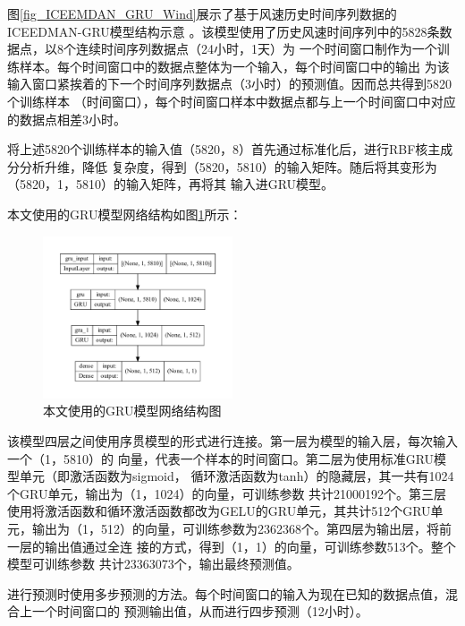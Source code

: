 \documentclass[AutoFakeBold]{LZUThesis}
\begin{document}
图\ref{fig_ICEEMDAN_GRU_Wind}展示了基于风速历史时间序列数据的ICEEDMAN-GRU模型结构示意
。该模型使用了历史风速时间序列中的5828条数据点，以8个连续时间序列数据点（24小时，1天）为
一个时间窗口制作为一个训练样本。每个时间窗口中的数据点整体为一个输入，每个时间窗口中的输出
为该输入窗口紧挨着的下一个时间序列数据点（3小时）的预测值。因而总共得到5820个训练样本
（时间窗口），每个时间窗口样本中数据点都与上一个时间窗口中对应的数据点相差3小时。

将上述5820个训练样本的输入值（5820，8）首先通过标准化后，进行RBF核主成分分析升维，降低
复杂度，得到（5820，5810）的输入矩阵。随后将其变形为（5820，1，5810）的输入矩阵，再将其
输入进GRU模型。

本文使用的GRU模型网络结构如图\ref{fig_gru}所示：

\begin{figure}[H]
	\centering
    \includegraphics[width=0.5\textwidth]{figures/wind_grumodel_plot.pdf}
    \caption{本文使用的GRU模型网络结构图}
    \label{fig_gru}
\end{figure}

该模型四层之间使用序贯模型的形式进行连接。第一层为模型的输入层，每次输入一个（1，5810）的
向量，代表一个样本的时间窗口。第二层为使用标准GRU模型单元（即激活函数为sigmoid，
循环激活函数为tanh）的隐藏层，其一共有1024个GRU单元，输出为（1，1024）的向量，可训练参数
共计21000192个。第三层使用将激活函数和循环激活函数都改为GELU的GRU单元，其共计512个GRU单
元，输出为（1，512）的向量，可训练参数为2362368个。第四层为输出层，将前一层的输出值通过全连
接的方式，得到（1，1）的向量，可训练参数513个。整个模型可训练参数
共计23363073个，输出最终预测值。

进行预测时使用多步预测的方法。每个时间窗口的输入为现在已知的数据点值，混合上一个时间窗口的
预测输出值，从而进行四步预测（12小时）。
\end{document}
